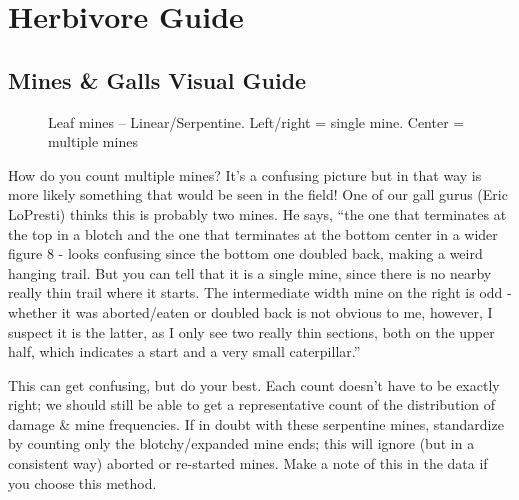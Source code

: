 \documentclass[
  letterpaper,
  oneside,
  open=any]{scrbook}
\begin{document}
\section{Herbivore Guide}\label{herbivore-guide}

\subsection{Mines \& Galls Visual Guide}\label{mines-galls-visual-guide}

\begin{figure}


\caption{\label{fig-mines1}Leaf mines -- Linear/Serpentine. Left/right =
single mine. Center = multiple mines}

\end{figure}%

How do you count multiple mines? It's a confusing picture but in that
way is more likely something that would be seen in the field! One of our
gall gurus (Eric LoPresti) thinks this is probably two mines. He says,
``the one that terminates at the top in a blotch and the one that
terminates at the bottom center in a wider figure 8 - looks confusing
since the bottom one doubled back, making a weird hanging trail. But you
can tell that it is a single mine, since there is no nearby really thin
trail where it starts. The intermediate width mine on the right is odd -
whether it was aborted/eaten or doubled back is not obvious to me,
however, I suspect it is the latter, as I only see two really thin
sections, both on the upper half, which indicates a start and a very
small caterpillar.''

This can get confusing, but do your best. Each count doesn't have to be
exactly right; we should still be able to get a representative count of
the distribution of damage \& mine frequencies. If in doubt with these
serpentine mines, standardize by counting only the blotchy/expanded mine
ends; this will ignore (but in a consistent way) aborted or re-started
mines. Make a note of this in the data if you choose this method.
\end{document}
